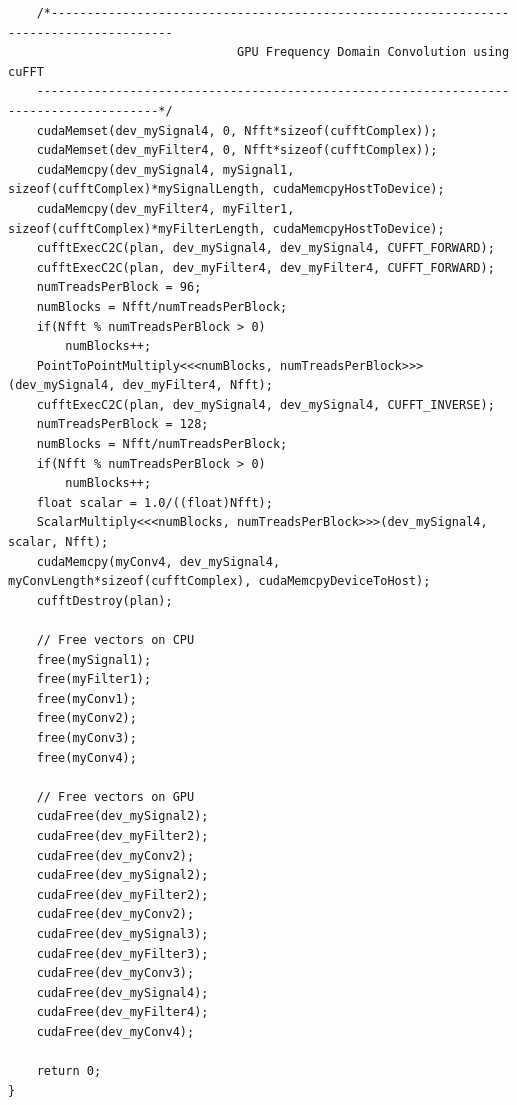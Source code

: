 \begin{lstlisting}
	/*---------------------------------------------------------------------------------------
                                GPU Frequency Domain Convolution using cuFFT
	---------------------------------------------------------------------------------------*/
	cudaMemset(dev_mySignal4, 0, Nfft*sizeof(cufftComplex));
	cudaMemset(dev_myFilter4, 0, Nfft*sizeof(cufftComplex));
	cudaMemcpy(dev_mySignal4, mySignal1, sizeof(cufftComplex)*mySignalLength, cudaMemcpyHostToDevice);
	cudaMemcpy(dev_myFilter4, myFilter1, sizeof(cufftComplex)*myFilterLength, cudaMemcpyHostToDevice);
	cufftExecC2C(plan, dev_mySignal4, dev_mySignal4, CUFFT_FORWARD);
	cufftExecC2C(plan, dev_myFilter4, dev_myFilter4, CUFFT_FORWARD);
	numTreadsPerBlock = 96;
	numBlocks = Nfft/numTreadsPerBlock;
	if(Nfft % numTreadsPerBlock > 0)
		numBlocks++;
	PointToPointMultiply<<<numBlocks, numTreadsPerBlock>>>(dev_mySignal4, dev_myFilter4, Nfft);
	cufftExecC2C(plan, dev_mySignal4, dev_mySignal4, CUFFT_INVERSE);
	numTreadsPerBlock = 128;
	numBlocks = Nfft/numTreadsPerBlock;
	if(Nfft % numTreadsPerBlock > 0)
		numBlocks++;
	float scalar = 1.0/((float)Nfft);
	ScalarMultiply<<<numBlocks, numTreadsPerBlock>>>(dev_mySignal4, scalar, Nfft);
	cudaMemcpy(myConv4, dev_mySignal4, myConvLength*sizeof(cufftComplex), cudaMemcpyDeviceToHost);
	cufftDestroy(plan);

	// Free vectors on CPU
	free(mySignal1);
	free(myFilter1);
	free(myConv1);
	free(myConv2);
	free(myConv3);
	free(myConv4);

	// Free vectors on GPU
	cudaFree(dev_mySignal2);
	cudaFree(dev_myFilter2);
	cudaFree(dev_myConv2);
	cudaFree(dev_mySignal2);
	cudaFree(dev_myFilter2);
	cudaFree(dev_myConv2);
	cudaFree(dev_mySignal3);
	cudaFree(dev_myFilter3);
	cudaFree(dev_myConv3);
	cudaFree(dev_mySignal4);
	cudaFree(dev_myFilter4);
	cudaFree(dev_myConv4);

	return 0;
}
\end{lstlisting}
\doublespacing